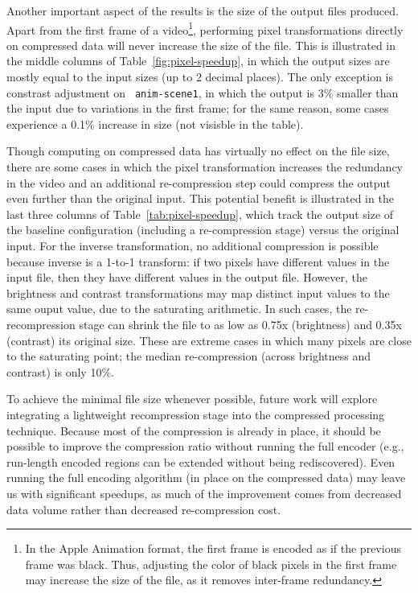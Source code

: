 Another important aspect of the results is the size of the output
files produced.  Apart from the first frame of a video\footnote{In the
Apple Animation format, the first frame is encoded as if the previous
frame was black.  Thus, adjusting the color of black pixels in the
first frame may increase the size of the file, as it removes
inter-frame redundancy.}, performing pixel transformations directly on
compressed data will never increase the size of the file.  This is
illustrated in the middle columns of Table~\ref{fig:pixel-speedup}, in
which the output sizes are mostly equal to the input sizes (up to 2
decimal places).  The only exception is constrast adjustment on {\tt
anim-scene1}, in which the output is 3\% smaller than the input due to
variations in the first frame; for the same reason, some cases
experience a 0.1\% increase in size (not visisble in the table).

Though computing on compressed data has virtually no effect on the
file size, there are some cases in which the pixel transformation
increases the redundancy in the video and an additional re-compression
step could compress the output even further than the original input.
This potential benefit is illustrated in the last three columns of
Table~\ref{tab:pixel-speedup}, which track the output size of the
baseline configuration (including a re-compression stage) versus the
original input.  For the inverse transformation, no additional
compression is possible because inverse is a 1-to-1 transform: if two
pixels have different values in the input file, then they have
different values in the output file.  However, the brightness and
contrast transformations may map distinct input values to the same
ouput value, due to the saturating arithmetic.  In such cases, the
re-recompression stage can shrink the file to as low as 0.75x
(brightness) and 0.35x (contrast) its original size.  These are
extreme cases in which many pixels are close to the saturating point;
the median re-compression (across brightness and contrast) is only
10\%.

To achieve the minimal file size whenever possible, future work will
explore integrating a lightweight recompression stage into the
compressed processing technique.  Because most of the compression is
already in place, it should be possible to improve the compression
ratio without running the full encoder (e.g., run-length encoded
regions can be extended without being rediscovered).  Even running the
full encoding algorithm (in place on the compressed data) may leave us
with significant speedups, as much of the improvement comes from
decreased data volume rather than decreased re-compression cost.

